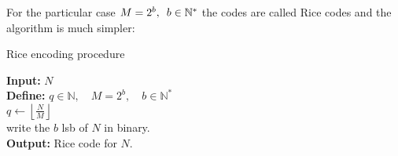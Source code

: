 For the particular case $M=2^b,\hspace{0.5em} b \in \mathbb{N}^*$ the codes are called Rice codes and the algorithm is much simpler:

\begin{algorithm}[H]
	\caption{Rice encoding procedure}
	\SetAlgoLined
	\textbf{Input:} $N$\\
	\textbf{Define:} $q \in \mathbb{N}, \quad M = 2^b, \quad b \in \mathbb{N}^*$\\
	$q \gets \left\lfloor \frac{N}{M} \right\rfloor$\\
	write the $b$ \acrshort{lsb} of $N$ in binary.\\
	\textbf{Output:} Rice code for $N$.
\end{algorithm}

